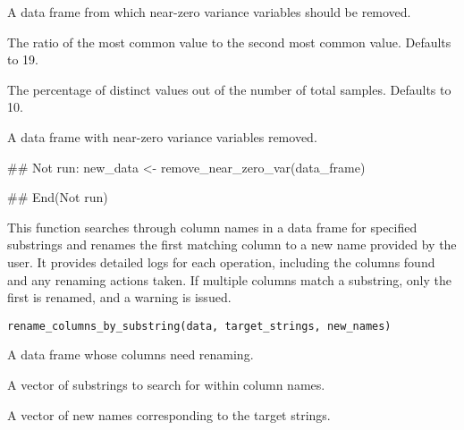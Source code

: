 \documentclass[a4paper]{book}
\begin{document}
%
\begin{Arguments}
\begin{ldescription}
\item[\code{data\_frame}] A data frame from which near-zero variance variables should be removed.

\item[\code{freqCut}] The ratio of the most common value to the second most common value. Defaults to 19.

\item[\code{uniqueCut}] The percentage of distinct values out of the number of total samples. Defaults to 10.
\end{ldescription}
\end{Arguments}
%
\begin{Value}
A data frame with near-zero variance variables removed.
\end{Value}
%
\begin{Examples}
\begin{ExampleCode}
## Not run: 
new_data <- remove_near_zero_var(data_frame)

## End(Not run)

\end{ExampleCode}
\end{Examples}
%
\begin{Description}
This function searches through column names in a data frame for specified substrings and renames the first matching column to a new name provided by the user. It provides detailed logs for each operation, including the columns found and any renaming actions taken. If multiple columns match a substring, only the first is renamed, and a warning is issued.
\end{Description}
%
\begin{Usage}
\begin{verbatim}
rename_columns_by_substring(data, target_strings, new_names)
\end{verbatim}
\end{Usage}
%
\begin{Arguments}
\begin{ldescription}
\item[\code{data}] A data frame whose columns need renaming.

\item[\code{target\_strings}] A vector of substrings to search for within column names.

\item[\code{new\_names}] A vector of new names corresponding to the target strings.
\end{ldescription}
\end{Arguments}
\end{document}
